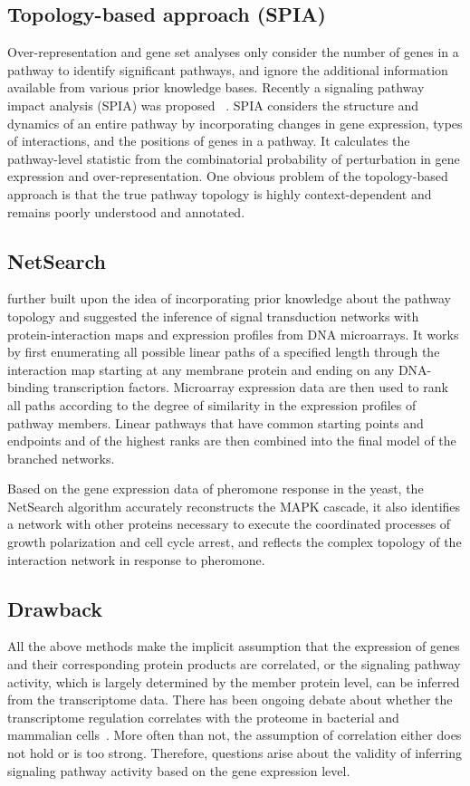 \subsection{Topology-based approach (SPIA)}
Over-representation and gene set analyses only consider the number of genes 
in a pathway to identify significant pathways, and ignore the additional 
information available from various prior knowledge bases. Recently a signaling
pathway impact analysis (SPIA) was proposed~%
\citep{Tarca2009}. SPIA considers the structure and dynamics of an entire 
pathway by incorporating changes in gene expression, types of interactions, 
and the positions of genes in a pathway. 
It calculates the pathway-level statistic from the combinatorial probability 
of perturbation in gene expression and over-representation. One obvious problem 
of the topology-based approach is that the true pathway topology is highly
context-dependent and remains poorly understood and annotated.

\subsection{NetSearch}
\cite{Steffen2002} further built upon the idea of incorporating 
prior knowledge about the pathway topology and suggested
the inference of signal transduction networks with protein-interaction maps
and expression profiles from DNA microarrays.
It works by first enumerating all possible linear paths
of a specified length through the interaction map starting
at any membrane protein and ending on any DNA-binding
transcription factors.
Microarray expression data are then used
to rank all paths according to the degree of similarity in
the expression profiles of pathway members.
Linear pathways
that have common starting points and endpoints
and of the highest ranks are then combined into the final
model of the branched networks.

Based on the gene expression data of pheromone response in the yeast, the 
NetSearch algorithm accurately reconstructs the MAPK cascade, it also identifies a 
network with other proteins necessary to execute the coordinated processes of 
growth polarization and cell cycle arrest, and reflects the complex topology of 
the interaction network in response to pheromone.

\subsection{Drawback}
All the above methods make the implicit assumption that the expression of genes
and their corresponding protein products are correlated, or the signaling 
pathway activity, which is largely determined by the member protein level, 
can be inferred from the transcriptome data. There has been ongoing debate 
about whether the transcriptome regulation correlates with the proteome
in bacterial and mammalian cells~\citep{Taniguchi2010,Ghazalpour2011}. More
often than not, the assumption of correlation either does not hold or is too 
strong. Therefore, questions arise about the validity of inferring signaling 
pathway activity based on the gene expression level.

